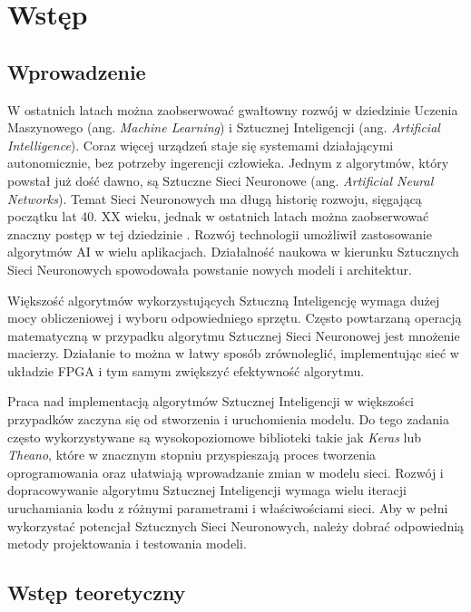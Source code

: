 \newpage %
\cleardoublepage %
\pagestyle{headings}
\section{Wstęp}

\subsection{Wprowadzenie}

W ostatnich latach można zaobserwować gwałtowny rozwój w dziedzinie 
Uczenia Maszynowego (ang. \emph{Machine Learning}) i Sztucznej Inteligencji 
(ang. \emph{Artificial Intelligence}). Coraz więcej urządzeń staje się systemami działającymi autonomicznie, bez potrzeby ingerencji człowieka. 
Jednym z algorytmów, który powstał już dość dawno, są Sztuczne Sieci Neuronowe (ang. \emph{Artificial Neural Networks}). Temat Sieci Neuronowych ma długą historię rozwoju, sięgającą początku lat 40. XX wieku, jednak w ostatnich latach można zaobserwować znaczny postęp w tej dziedzinie \cite{Kriesel2007NeuralNetworks}. Rozwój technologii umożliwił zastosowanie algorytmów AI w wielu aplikacjach. Działalność naukowa w kierunku Sztucznych Sieci Neuronowych spowodowała powstanie nowych modeli i architektur.

Większość algorytmów wykorzystujących Sztuczną Inteligencję wymaga dużej mocy 
obliczeniowej i wyboru odpowiedniego sprzętu. Często powtarzaną operacją matematyczną 
w przypadku algorytmu Sztucznej Sieci Neuronowej jest mnożenie macierzy.
Działanie to można w łatwy sposób zrównoleglić, implementując sieć w układzie 
FPGA i tym samym zwiększyć efektywność algorytmu.

Praca nad implementacją algorytmów Sztucznej Inteligencji w większości 
przypadków zaczyna się od stworzenia i uruchomienia modelu. Do tego zadania 
często wykorzystywane są wysokopoziomowe biblioteki takie jak \emph{Keras} lub \emph{Theano}, które w znacznym stopniu przyspieszają proces tworzenia oprogramowania oraz ułatwiają wprowadzanie zmian w modelu sieci. Rozwój i dopracowywanie 
algorytmu Sztucznej Inteligencji wymaga wielu iteracji uruchamiania kodu 
z różnymi parametrami i właściwościami sieci. Aby w pełni wykorzystać potencjał Sztucznych Sieci Neuronowych, należy dobrać odpowiednią metody projektowania i testowania modeli.

\subsection{Wstęp teoretyczny}

